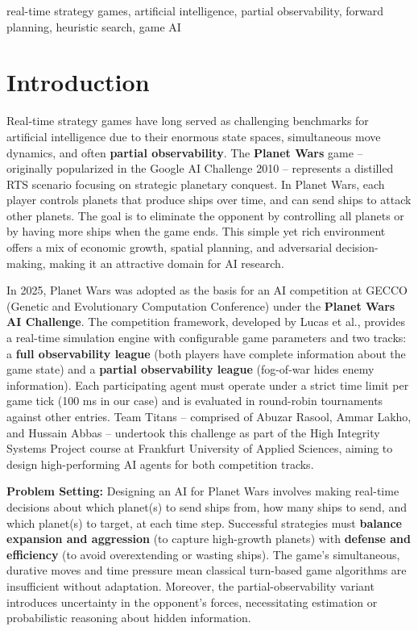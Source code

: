 \documentclass[conference]{IEEEtran}
\begin{document}
\begin{IEEEkeywords}
real-time strategy games, artificial intelligence, partial observability, forward planning, heuristic search, game AI
\end{IEEEkeywords}

\section{Introduction}
Real-time strategy games have long served as challenging benchmarks for artificial intelligence due to their enormous state spaces, simultaneous move dynamics, and often \textbf{partial observability}. The \textbf{Planet Wars} game -- originally popularized in the Google AI Challenge 2010 -- represents a distilled RTS scenario focusing on strategic planetary conquest. In Planet Wars, each player controls planets that produce ships over time, and can send ships to attack other planets. The goal is to eliminate the opponent by controlling all planets or by having more ships when the game ends. This simple yet rich environment offers a mix of economic growth, spatial planning, and adversarial decision-making, making it an attractive domain for AI research.

In 2025, Planet Wars was adopted as the basis for an AI competition at GECCO (Genetic and Evolutionary Computation Conference) under the \textbf{Planet Wars AI Challenge}. The competition framework, developed by Lucas et al., provides a real-time simulation engine with configurable game parameters and two tracks: a \textbf{full observability league} (both players have complete information about the game state) and a \textbf{partial observability league} (fog-of-war hides enemy information). Each participating agent must operate under a strict time limit per game tick (100 ms in our case) and is evaluated in round-robin tournaments against other entries. Team Titans -- comprised of Abuzar Rasool, Ammar Lakho, and Hussain Abbas -- undertook this challenge as part of the High Integrity Systems Project course at Frankfurt University of Applied Sciences, aiming to design high-performing AI agents for both competition tracks.

\textbf{Problem Setting:} Designing an AI for Planet Wars involves making real-time decisions about which planet(s) to send ships from, how many ships to send, and which planet(s) to target, at each time step. Successful strategies must \textbf{balance expansion and aggression} (to capture high-growth planets) with \textbf{defense and efficiency} (to avoid overextending or wasting ships). The game's simultaneous, durative moves and time pressure mean classical turn-based game algorithms are insufficient without adaptation. Moreover, the partial-observability variant introduces uncertainty in the opponent's forces, necessitating estimation or probabilistic reasoning about hidden information.
\end{document}
